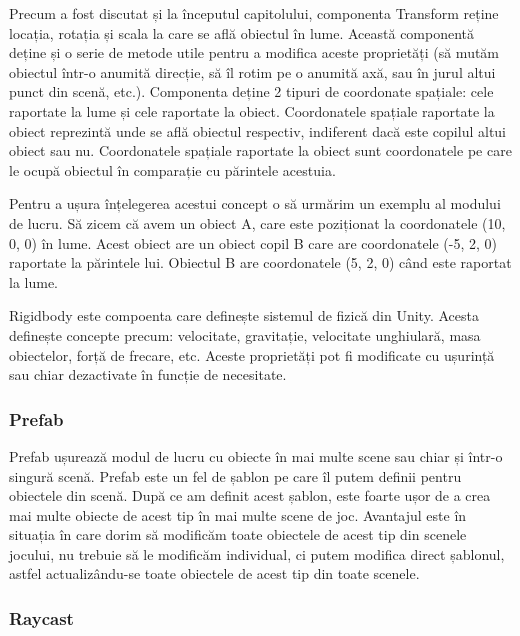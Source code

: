 \documentclass[12pt, a4paper]{article}
\begin{document}
	Precum a fost discutat și la începutul capitolului, componenta Transform reține locația, rotația și scala la care se află obiectul în lume. Această componentă deține și o serie de metode utile pentru a modifica aceste proprietăți (să mutăm obiectul într-o anumită direcție, să îl rotim pe o anumită axă, sau în jurul altui punct din scenă, etc.). Componenta deține 2 tipuri de coordonate spațiale: cele raportate la lume și cele raportate la obiect. Coordonatele spațiale raportate la obiect reprezintă unde se află obiectul respectiv, indiferent dacă este copilul altui obiect sau nu. Coordonatele spațiale raportate la obiect sunt coordonatele pe care le ocupă obiectul în comparație cu părintele acestuia.
	\newline
	
	Pentru a ușura înțelegerea acestui concept o să urmărim un exemplu al modului de lucru. Să zicem că avem un obiect A, care este poziționat la coordonatele (10, 0, 0) în lume. Acest obiect are un obiect copil B care are coordonatele (-5, 2, 0) raportate la părintele lui. Obiectul B are coordonatele (5, 2, 0) când este raportat la lume.
	\newline
	
	Rigidbody este compoenta care definește sistemul de fizică din Unity. Acesta definește concepte precum: velocitate, gravitație, velocitate unghiulară, masa obiectelor, forță de frecare, etc. Aceste proprietăți pot fi modificate cu ușurință sau chiar dezactivate în funcție de necesitate.
	
	
	
	
	
	\subsubsection{Prefab}
	
	Prefab ușurează modul de lucru cu obiecte în mai multe scene sau chiar și într-o singură scenă. Prefab este un fel de șablon pe care îl putem definii pentru obiectele din scenă. După ce am definit acest șablon, este foarte ușor de a crea mai multe obiecte de acest tip în mai multe scene de joc. Avantajul este în situația în care dorim să modificăm toate obiectele de acest tip din scenele jocului, nu trebuie să le modificăm individual, ci putem modifica direct șablonul, astfel actualizându-se toate obiectele de acest tip din toate scenele.
	
	
	
	
	
	\subsubsection{Raycast}
	
\end{document}
